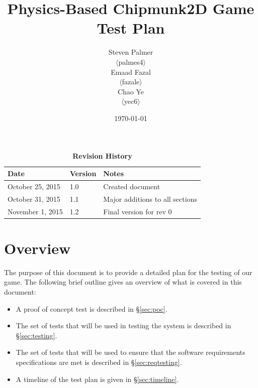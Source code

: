 \documentclass[12pt, titlepage]{article}
\begin{document}
\title{\bf Physics-Based Chipmunk2D Game\\[\baselineskip]\Large Test Plan}
\author{Steven Palmer\\$\langle$palmes4$\rangle$\\Emaad Fazal\\$\langle$fazale$\rangle$\\Chao Ye\\$\langle$yec6$\rangle$}
\date{\today}
	
\maketitle

\tableofcontents
\listoftables
\listoffigures


\begin{table}[bp]
\caption*{\bf Revision History}
\begin{tabularx}{\textwidth}{p{3.5cm}p{2cm}X}
\toprule {\bf Date} & {\bf Version} & {\bf Notes}\\
\midrule
October 25, 2015 & 1.0 & Created document\\
October 31, 2015 & 1.1 & Major additions to all sections\\
November 1, 2015 & 1.2 & Final version for rev 0\\
\bottomrule
\end{tabularx}
\end{table}

\newpage


\section{Overview}
The purpose of this document is to provide a detailed plan for the testing of our game.  The following brief outline gives an overview of what is covered in this document:

\begin{itemize}
  \item A proof of concept test is described in \hyperref[sec:poc]{\S\ref*{sec:poc}}.
  \item The set of tests that will be used in testing the system is described in \hyperref[sec:testing]{\S\ref*{sec:testing}}.
  \item The set of tests that will be used to ensure that the software requirements specifications are met is described in \hyperref[sec:reqtesting]{\S\ref*{sec:reqtesting}}.
  \item A timeline of the test plan is given in \hyperref[sec:timeline]{\S\ref*{sec:timeline}}.
\end{itemize}
\end{document}
